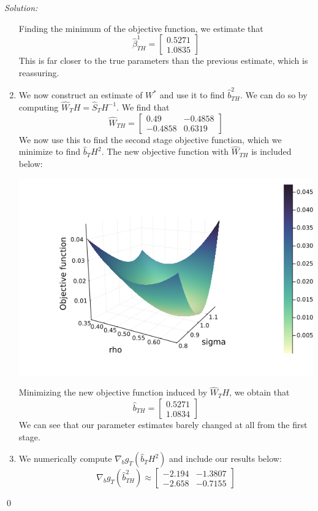 \documentclass[12pt]{article}
\newenvironment{sol}
    {\emph{Solution:}
    }
    {
    \qed
    }
\begin{document}
\begin{sol}
\begin{enumerate}[label=\alph*) ]
        Finding the minimum of the objective function, we estimate that
        \[\hat{\beta}_{TH}^1 = \begin{bmatrix} 0.5271 \\ 1.0835\end{bmatrix}\]
        This is far closer to the true parameters than the previous estimate, which is reassuring. 
        \item We now construct an estimate of $W^*$ and use it to find $\hat{b}_{TH}^2$. We can do so by computing $\hat{W}_TH = \hat{S}_TH^{-1}$. We find that
        \[\hat{W}_{TH} = \begin{bmatrix} 0.49 & -0.4858\\ -0.4858 & 0.6319\end{bmatrix}\]
        We now use this to find the second stage objective function, which we minimize to find $\hat{b}_TH^2$. The new objective function with $\hat{W}_{TH}$ is included below:
        \begin{center}
            \includegraphics[scale=0.4]{jthplot_2_2nd.png}
        \end{center}
        Minimizing the new objective function induced by $\hat{W}_TH$, we obtain that
        \[\hat{b}_{TH} = \begin{bmatrix}0.5271\\1.0834\end{bmatrix}\]
        We can see that our parameter estimates barely changed at all from the first stage.
        \item We numerically compute $\nabla_b g_T(\hat{b}_TH^2)$ and include our results below:
        \[\nabla_b g_T(\hat{b}_{TH}^2) \approx \begin{bmatrix}-2.194  &-1.3807\\ -2.658& -0.7155\end{bmatrix}\]

\end{enumerate}
\end{sol}
\end{document}
